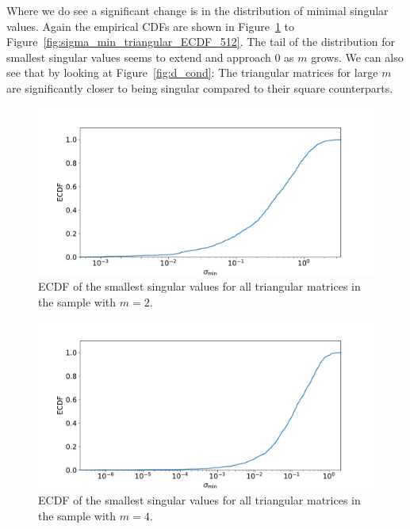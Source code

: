 \documentclass[a4paper, 11pt]{article}
\begin{document}
Where we do see a significant change is in the distribution of minimal singular
values. Again the empirical CDFs are shown in
Figure~\ref{fig:sigma_min_triangular_ECDF_2} to
Figure~\ref{fig:sigma_min_triangular_ECDF_512}. The tail of the distribution
for smallest singular values seems to extend and approach 0 as $m$ grows. We can
also see that by looking at Figure~\ref{fig:d_cond}: The triangular matrices
for large $m$ are significantly closer to being singular compared to their
square counterparts.
\begin{figure}
  \centering
  \includegraphics[width=\textwidth]{../2/triangular/ecdf/2.pdf}
  \caption{ECDF of the smallest singular values for all triangular matrices in
  the sample with $m=2$.}
  \label{fig:sigma_min_triangular_ECDF_2}
\end{figure}
\begin{figure}
  \centering
  \includegraphics[width=\textwidth]{../2/triangular/ecdf/4.pdf}
  \caption{ECDF of the smallest singular values for all triangular matrices in
  the sample with $m=4$.}
  \label{fig:sigma_min_triangular_ECDF_4}
\end{figure}
\end{document}
